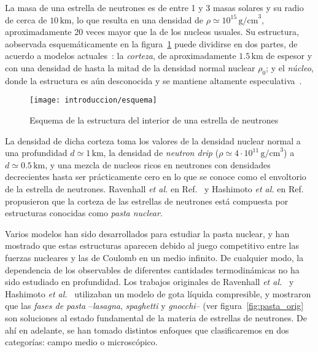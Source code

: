 La masa de una estrella de neutrones es de entre 1 y 3 masas solares y su radio de cerca de $10\,\text{km}$, lo que resulta en una densidad de $\rho \simeq 10^{15}\,\text{g/cm}^3$, aproximadamente 20 veces mayor que la de los nucleos usuales.
Su estructura, aobservada esquemáticamente en la figura~\ref{fig:esquema} puede dividirse en dos partes, de acuerdo a modelos actuales~\cite{page_minimal_2004, geppert_temperature_2004}: la \emph{corteza}, de aproximadamente $1.5\,\text{km}$ de espesor y con una densidad de hasta la mitad de la densidad normal nuclear $\rho_0$; y el \emph{núcleo}, donde la estructura es aún desconocida y se mantiene altamente especulativa~\cite{akmal_equation_1998, ravenhall_structure_1983, oyamatsu_nuclear_1993, woosley_physics_2005}.

\begin{figure}[h]
  \centering
  \texttt{[image: introduccion/esquema]}
  \caption{Esquema de la estructura del interior de una estrella de neutrones}
\label{fig:esquema}
\end{figure}

La densidad de dicha corteza toma los valores de la densidad nuclear normal a una profundidad $d \simeq 1\,\text{km}$, la densidad de \emph{neutron drip} ($\rho\simeq 4 \cdot 10^{11}\,\text{g/cm}^3$) a $d\simeq 0.5\,\text{km}$, y una mezcla de nucleos ricos en neutrones con densidades decrecientes hasta ser prácticamente cero en lo que se conoce como el envoltorio de la estrella de neutrones.
Ravenhall \emph{et al.} en Ref.~\cite{ravenhall_structure_1983} y Hashimoto \emph{et al.} en Ref.~\cite{hashimoto_shape_1984} propusieron que la corteza de las estrellas de neutrones está compuesta por estructuras conocidas como \emph{pasta nuclear}.

Varios modelos han sido desarrollados para estudiar la pasta nuclear, y han mostrado que estas estructuras aparecen debido al juego competitivo entre las fuerzas nucleares y las de Coulomb en un medio infinito.
De cualquier modo, la dependencia de los observables de diferentes cantidades termodinámicas no ha sido estudiado en profundidad.
Los trabajos originales de Ravenhall \emph{et al.}~\cite{ravenhall_structure_1983} y Hashimoto \emph{et al.}~\cite{hashimoto_shape_1984} utilizaban un modelo de gota líquida compresible, y mostraron que las \emph{fases de pasta} --\emph{lasagna}, \emph{spaghetti} y \emph{gnocchi}-- (ver figura~\ref{fig:pasta_orig} son soluciones al estado fundamental de la materia de estrellas de neutrones.
De ahí en adelante, se han tomado distintos enfoques que clasificaremos en dos categorías: campo medio o microscópico.

